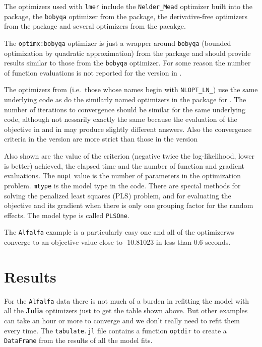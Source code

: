 \documentclass[article]{jss}
\begin{document}
The optimizers used with \texttt{lmer} include the \texttt{Nelder\_Mead}
optimizer built into the  package, the \texttt{bobyqa}
optimizer from the
 package, the derivative-free optimizers from the
 package and several optimizers from the
 pacakge.

The \texttt{optimx:bobyqa} optimizer is just a wrapper around
\texttt{bobyqa} (bounded optimization by quadratic approximation) from
the  package and should provide results similar to those
from the \texttt{bobyqa} optimizer. For some reason the number of
function evaluations is not reported for the version in .

The optimizers from  (i.e.~those whose names begin with
\texttt{NLOPT\_LN\_}) use the same underlying code as do the similarly
named optimizers in the  package for . The
number of iterations to convergence should be similar for the same
underlying code, although not nessarily exactly the same because the
evaluation of the objective in  and in  may
produce slightly different answers. Also the convergence criteria in the
 version are more strict than those in the 
version

Also shown are the value of the criterion (negative twice the
log-likelihood, lower is better) achieved, the elapsed time and the
number of function and gradient evaluations. The \texttt{nopt} value is
the number of parameters in the optimization problem. \texttt{mtype} is
the model type in the  code. There are special methods for
solving the penalized least squares (PLS) problem, and for evaluating
the objective and its gradient when there is only one grouping factor
for the random effects. The model type is called \texttt{PLSOne}.

The \texttt{Alfalfa} example is a particularly easy one and all of the
optimizerws converge to an objective value close to -10.81023 in less
than 0.6 seconds.

\section[Results]{Results}

For the \texttt{Alfalfa} data there is not much of a burden in refitting
the model with all the \textbf{Julia} optimizers just to get the table
shown above. But other examples can take an hour or more to converge and
we don't really need to refit them every time. The \texttt{tabulate.jl}
file contains a function \texttt{optdir} to create a \texttt{DataFrame}
from the results of all the model fits.
\end{document}
